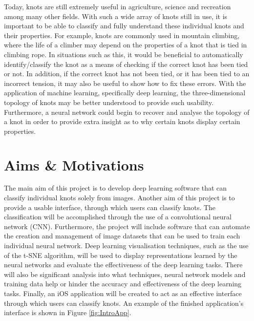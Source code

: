 \documentclass{l4proj}
\begin{document}
Today, knots are still extremely useful in agriculture, science and recreation among many other fields. 
With such a wide array of knots still in use, it is important to be able to classify and fully understand these individual knots and their properties. 
For example, knots are commonly used in mountain climbing, where the life of a climber may depend on the properties of a knot that is tied in climbing rope. 
In situations such as this, it would be beneficial to automatically identify/classify the knot as a means of checking if the correct knot has been tied or not. 
In addition, if the correct knot has not been tied, or it has been tied to an incorrect tension, it may also be useful to show how to fix these errors. 
With the application of machine learning, specifically deep learning, the three-dimensional topology of knots may be better understood to provide such usability. 
Furthermore, a neural network could begin to recover and analyse the topology of a knot in order to provide extra insight as to why certain knots display certain properties.

\section{Aims \& Motivations}
The main aim of this project is to develop deep learning software that can classify individual knots solely from images.
Another aim of this project is to provide a usable interface, through which users can classify knots. 
The classification will be accomplished through the use of a convolutional neural network (CNN). 
Furthermore, the project will include software that can automate the creation and management of image datasets that can be used to train each individual neural network. 
Deep learning visualisation techniques, such as the use of the t-SNE algorithm, will be used to display representations learned by the neural networks and evaluate the effectiveness of the deep learning tasks. 
There will also be significant analysis into what techniques, neural network models and training data help or hinder the accuracy and effectiveness of the deep learning tasks.
Finally, an iOS application will be created to act as an effective interface through which users can classify knots.
An example of the finished application's interface is shown in Figure \ref{fig:IntroApp}.
\end{document}
